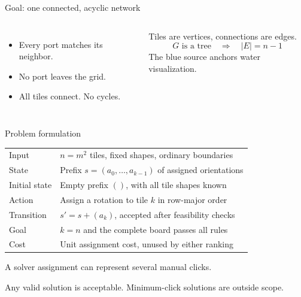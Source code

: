 
\begin{frame}{Goal: one connected, acyclic network}
\begin{columns}[c,onlytextwidth]
\centering
{}
\begin{itemize}
\item Every port matches its neighbor.
\item No port leaves the grid.
\item All tiles connect. No cycles.
\end{itemize}
\vspace{4mm}
Tiles are vertices, connections are edges.
\[
G\text{ is a tree} \quad\Longrightarrow\quad |E|=n-1
\]
\small The blue source anchors water visualization.
\end{columns}
\end{frame}

\begin{frame}{Problem formulation}
\small
\begin{tabular}{@{}p{}p{}@{}}
\toprule
Input & $n=m^2$ tiles, fixed shapes, ordinary boundaries \\
State & Prefix $s=(a_0,\ldots,a_{k-1})$ of assigned orientations \\
Initial state & Empty prefix $()$, with all tile shapes known \\
Action & Assign a rotation to tile $k$ in row-major order \\
Transition & $s'=s+(a_k)$, accepted after feasibility checks \\
Goal & $k=n$ and the complete board passes all rules \\
Cost & Unit assignment cost, unused by either ranking \\
\bottomrule
\end{tabular}\par
\vspace{5mm}
\normalsize A solver assignment can represent several manual clicks.\par
\small Any valid solution is acceptable. Minimum-click solutions are outside scope.
\end{frame}

